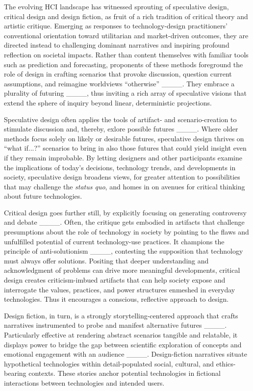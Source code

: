 The evolving HCI landscape has witnessed sprouting of speculative design, 
critical design 
and design fiction, 
as fruit of a rich tradition of critical theory and artistic critique. Emerging as responses to technology-design practitioners' conventional orientation toward utilitarian and market-driven outcomes, they are directed instead to challenging dominant narratives and inspiring profound reflection on societal impacts. Rather than content themselves with familiar tools such as prediction and forecasting, proponents of these methods foreground the role of design in crafting scenarios that provoke discussion, question current assumptions, and reimagine worldviews ``otherwise'' ____. They embrace a plurality of futuring ____, thus inviting a rich array of speculative visions that extend the sphere of inquiry beyond linear, deterministic projections.

Speculative design often applies the tools of artifact- and scenario-creation to stimulate discussion and, thereby, exlore possible futures ____. Where older methods focus solely on likely or desirable futures, speculative design thrives on ``what if...?'' scenarios to bring in also those futures that could yield insight even if they remain improbable. By letting designers and other participants examine the implications of today's decisions, technology trends, and developments in society, speculative design broadens views, for greater attention to possibilities that may challenge the \emph{status quo}, and homes in on avenues for critical thinking about future technologies.

Critical design goes further still, by explicitly focusing on generating controversy and debate ____. Often, the critique gets embodied in artifacts that challenge presumptions about the role of technology in society by pointing to the flaws and unfulfilled potential of current technology-use practices. It champions the principle of anti-solutionism ____, contesting the supposition that technology must always offer solutions. Positing that deeper understanding and acknowledgment of problems can drive more meaningful developments, critical design creates criticism-imbued artifacts that can help society expose and interrogate the values, practices, and power structures enmeshed in everyday technologies. Thus it encourages a conscious, reflective approach to design.

Design fiction, in turn, is a strongly storytelling-centered approach that crafts narratives instrumented to probe and manifest alternative futures ____. Particularly effective at rendering abstract scenarios tangible and relatable, it displays power to bridge the gap between scientific exploration of concepts and emotional engagement with an audience ____. Design-fiction narratives situate hypothetical technologies within detail-populated social, cultural, and ethics-bearing contexts. These stories anchor potential technologies in fictional interactions between technologies and intended users. 

